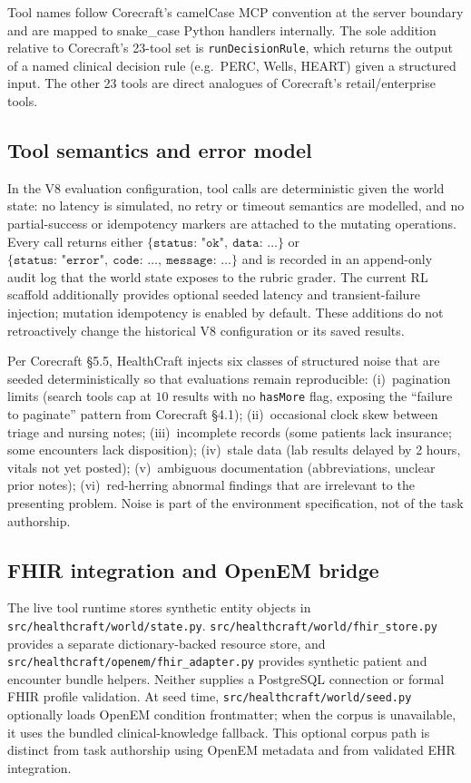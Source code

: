 Tool names follow Corecraft's camelCase MCP convention at the server
boundary and are mapped to snake\_case Python handlers internally. The
sole addition relative to Corecraft's 23-tool set is
\texttt{runDecisionRule}, which returns the output of a named clinical
decision rule (e.g.\ PERC, Wells, HEART) given a structured input. The
other 23 tools are direct analogues of Corecraft's retail/enterprise
tools.

\subsection{Tool semantics and error model}
\label{sec:semantics}
In the V8 evaluation configuration, tool calls are deterministic given
the world state: no latency is
simulated, no retry or timeout semantics are modelled, and no
partial-success or idempotency markers are attached to the mutating
operations. Every call returns either
$\{\texttt{status}{:}\,\texttt{"ok"},\ \texttt{data}{:}\,\ldots\}$
or
$\{\texttt{status}{:}\,\texttt{"error"},\ \texttt{code}{:}\,\ldots,\ \texttt{message}{:}\,\ldots\}$
and is recorded in an append-only audit log that the world state
exposes to the rubric grader. The current RL scaffold additionally
provides optional seeded latency and transient-failure injection;
mutation idempotency is enabled by default. These additions do not
retroactively change the historical V8 configuration or its saved results.

Per Corecraft \S5.5, HealthCraft injects six classes of
structured noise that are seeded deterministically so that evaluations
remain reproducible: (i)~pagination limits (search tools cap at $10$
results with no \texttt{hasMore} flag, exposing the ``failure to
paginate'' pattern from Corecraft \S4.1); (ii)~occasional clock skew
between triage and nursing notes; (iii)~incomplete records (some
patients lack insurance; some encounters lack disposition); (iv)~stale
data (lab results delayed by 2 hours, vitals not yet posted);
(v)~ambiguous documentation (abbreviations, unclear prior notes);
(vi)~red-herring abnormal findings that are irrelevant to the presenting
problem. Noise is part of the environment specification, not of the
task authorship.

\subsection{FHIR integration and OpenEM bridge}
\label{sec:fhir}
The live tool runtime stores synthetic entity objects in
\texttt{src/healthcraft/world/state.py}.
\texttt{src/healthcraft/world/fhir\_store.py} provides a separate
dictionary-backed resource store, and
\texttt{src/healthcraft/openem/fhir\_adapter.py} provides synthetic
patient and encounter bundle helpers. Neither supplies a PostgreSQL
connection or formal FHIR profile validation. At seed time,
\texttt{src/healthcraft/world/seed.py} optionally loads OpenEM condition
frontmatter; when the corpus is unavailable, it uses the bundled
clinical-knowledge fallback. This optional corpus path is distinct from
task authorship using OpenEM metadata and from validated EHR integration.

